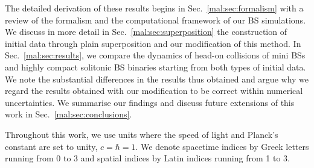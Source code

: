 The detailed derivation of these results begins
in Sec.~\ref{mal:sec:formalism} with a review of
the formalism and the computational framework of our
BS simulations. We discuss in more detail
in Sec.~\ref{mal:sec:superposition} the construction of initial
data through plain superposition and our modification of this
method. In Sec.~\ref{mal:sec:results}, we compare the dynamics
of head-on collisions of mini BSs and highly compact solitonic BS
binaries starting from both types of initial data. We note
the substantial differences in the results thus obtained
and argue why we regard the results obtained with our
modification to be correct within numerical uncertainties.
We summarise our findings
and discuss future extensions of this work in
Sec.~\ref{mal:sec:conclusions}.

Throughout this work, we use units where the speed of light and
Planck's constant are set to unity, $c=\hbar=1$. We denote
spacetime indices by Greek letters running from 0 to 3 and
spatial indices by Latin indices running from 1 to 3.

